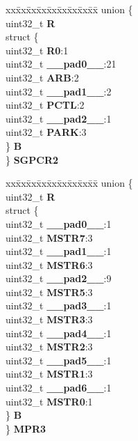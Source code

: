 \begin{DoxyCompactItemize}
\begin{tabbing}
\end{tabbing}\item 
\mbox{\label{structXBAR__tag_a7e79e88b3f37c1be71968187e5adf5d0}} 
\begin{tabbing}
xx\=xx\=xx\=xx\=xx\=xx\=xx\=xx\=xx\=\kill
union \{\\
\>uint32\_t {\bfseries R}\\
\>struct \{\\
\>\>uint32\_t {\bfseries R0}:1\\
\>\>uint32\_t {\bfseries \_\_pad0\_\_}:21\\
\>\>uint32\_t {\bfseries ARB}:2\\
\>\>uint32\_t {\bfseries \_\_pad1\_\_}:2\\
\>\>uint32\_t {\bfseries PCTL}:2\\
\>\>uint32\_t {\bfseries \_\_pad2\_\_}:1\\
\>\>uint32\_t {\bfseries PARK}:3\\
\>\} {\bfseries B}\\
\} {\bfseries SGPCR2}\\

\end{tabbing}\item 
\mbox{\label{structXBAR__tag_ae33d4edcd2151e649ed95bf41176fe7e}} 
\begin{tabbing}
xx\=xx\=xx\=xx\=xx\=xx\=xx\=xx\=xx\=\kill
union \{\\
\>uint32\_t {\bfseries R}\\
\>struct \{\\
\>\>uint32\_t {\bfseries \_\_pad0\_\_}:1\\
\>\>uint32\_t {\bfseries MSTR7}:3\\
\>\>uint32\_t {\bfseries \_\_pad1\_\_}:1\\
\>\>uint32\_t {\bfseries MSTR6}:3\\
\>\>uint32\_t {\bfseries \_\_pad2\_\_}:9\\
\>\>uint32\_t {\bfseries MSTR5}:3\\
\>\>uint32\_t {\bfseries \_\_pad3\_\_}:1\\
\>\>uint32\_t {\bfseries MSTR3}:3\\
\>\>uint32\_t {\bfseries \_\_pad4\_\_}:1\\
\>\>uint32\_t {\bfseries MSTR2}:3\\
\>\>uint32\_t {\bfseries \_\_pad5\_\_}:1\\
\>\>uint32\_t {\bfseries MSTR1}:3\\
\>\>uint32\_t {\bfseries \_\_pad6\_\_}:1\\
\>\>uint32\_t {\bfseries MSTR0}:1\\
\>\} {\bfseries B}\\
\} {\bfseries MPR3}\\


\end{tabbing}
\end{DoxyCompactItemize}
